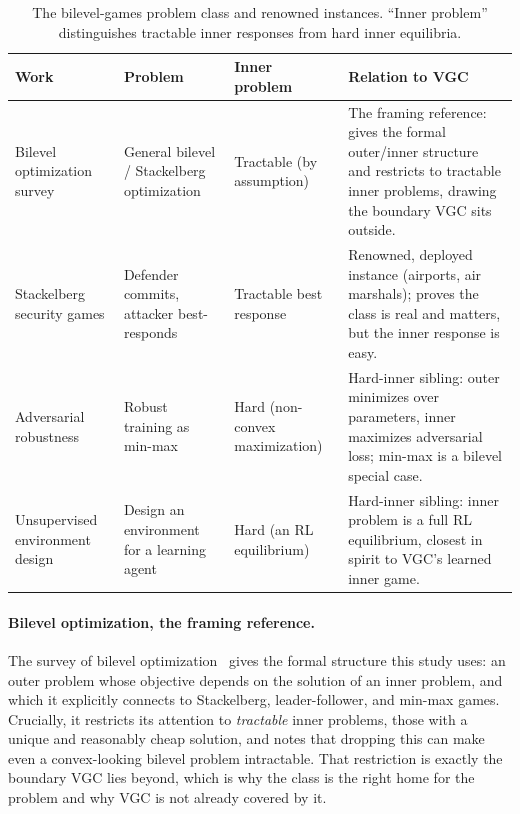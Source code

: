 \begin{table}[ht]
\small
\tablespacing
\begin{tabularx}{\textwidth}{@{}>{\hsize=0.62\hsize\raggedright\arraybackslash}X
                                >{\hsize=1.05\hsize\raggedright\arraybackslash}X
                                >{\hsize=0.60\hsize\raggedright\arraybackslash}X
                                >{\hsize=1.73\hsize\raggedright\arraybackslash}X@{}}
\toprule
\textbf{Work} & \textbf{Problem} & \textbf{Inner problem} & \textbf{Relation to VGC} \\
\midrule
Bilevel optimization survey \cite{zhang2023bilevel}
  & General bilevel / Stackelberg optimization
  & Tractable (by assumption)
  & The framing reference: gives the formal outer/inner structure and restricts to
    tractable inner problems, drawing the boundary VGC sits outside. \\
\addlinespace
Stackelberg security games \cite{tambe2011security}
  & Defender commits, attacker best-responds
  & Tractable best response
  & Renowned, deployed instance (airports, air marshals); proves the class is real
    and matters, but the inner response is easy. \\
\addlinespace
Adversarial robustness \cite{madry2018towards}
  & Robust training as min-max
  & Hard (non-convex maximization)
  & Hard-inner sibling: outer minimizes over parameters, inner maximizes
    adversarial loss; min-max is a bilevel special case. \\
\addlinespace
Unsupervised environment design \cite{dennis2020emergent}
  & Design an environment for a learning agent
  & Hard (an RL equilibrium)
  & Hard-inner sibling: inner problem is a full RL equilibrium, closest in spirit
    to VGC's learned inner game. \\
\bottomrule
\end{tabularx}
\caption{The bilevel-games problem class and renowned instances. ``Inner problem''
distinguishes tractable inner responses from hard inner equilibria.}
\label{tab:bilevel}
\end{table}

\paragraph{Bilevel optimization, the framing reference.}
The survey of bilevel optimization~\cite{zhang2023bilevel} gives the formal
structure this study uses: an outer problem whose objective depends on the
solution of an inner problem, and which it explicitly connects to Stackelberg,
leader-follower, and min-max games. Crucially, it restricts its attention to
\emph{tractable} inner problems, those with a unique and reasonably cheap
solution, and notes that dropping this can make even a convex-looking bilevel
problem intractable. That restriction is exactly the boundary VGC lies beyond,
which is why the class is the right home for the problem and why VGC is not
already covered by it.

